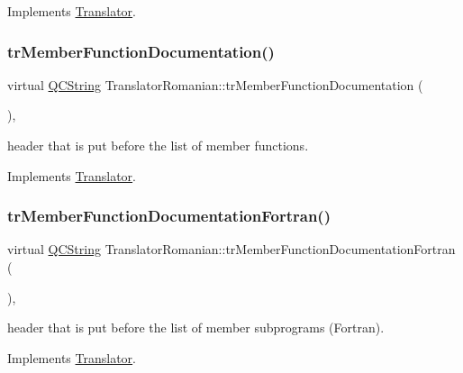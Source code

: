 Implements \mbox{\hyperlink{class_translator}{Translator}}.

\mbox{\label{class_translator_romanian_aa6dd2349e0ea36bde29c19d1a7c70c91}} 
\subsubsection{\texorpdfstring{trMemberFunctionDocumentation()}{trMemberFunctionDocumentation()}}
{\footnotesize\ttfamily virtual \mbox{\hyperlink{class_q_c_string}{Q\+C\+String}} Translator\+Romanian\+::tr\+Member\+Function\+Documentation (\begin{DoxyParamCaption}{ }\end{DoxyParamCaption})\hspace{0.3cm}{\ttfamily [inline]}, {\ttfamily [virtual]}}

header that is put before the list of member functions. 

Implements \mbox{\hyperlink{class_translator}{Translator}}.

\mbox{\label{class_translator_romanian_a814d711e26c31ff61a556144af1a1f49}} 
\subsubsection{\texorpdfstring{trMemberFunctionDocumentationFortran()}{trMemberFunctionDocumentationFortran()}}
{\footnotesize\ttfamily virtual \mbox{\hyperlink{class_q_c_string}{Q\+C\+String}} Translator\+Romanian\+::tr\+Member\+Function\+Documentation\+Fortran (\begin{DoxyParamCaption}{ }\end{DoxyParamCaption})\hspace{0.3cm}{\ttfamily [inline]}, {\ttfamily [virtual]}}

header that is put before the list of member subprograms (Fortran). 

Implements \mbox{\hyperlink{class_translator}{Translator}}.

